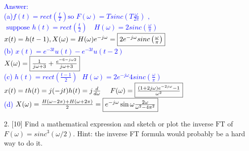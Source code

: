 \documentclass[12pt,a4paper]{article}
\begin{document}
\begin{tcolorbox}
\normalsize
\textcolor{blue}{Answer:\\
(a)$f(t)={rect}\left(\frac{t}{T}\right)\text{so }F(\omega)=T {sinc}\left(T \frac{\omega}{2 \pi}\right) \text { , }$\\
    $\text { suppose } h(t)={rect}\left(\frac{t}{2}\right) \quad H(\omega)=2 {sinc}\left(\frac{\omega}{\pi}\right)$\\
    $x(t)=h(t-1), X(\omega)=H(\omega) e^{-j \omega}=\fbox{$2 e^{-j \omega} {sinc}\left(\frac{\omega}{\pi}\right)$}$\\
(b) $x(t)=e^{-3t}u(t)-e^{-3t}u(t-2)$\\
$X(\omega)=\fbox{$\frac{1}{j\omega+3}+\frac{e^{-6-j\omega2}}{j\omega+3}$}$\\
(c) $ h(t)={rect}\left(\frac{t-1}{2}\right)~~~H(\omega)=2 e^{-j \omega} 4{sinc}\left(\frac{\omega}{\pi}\right)$\\
$x(t)=th(t)=j(-jt)h(t)=j\frac{d}{d\omega}~~~~F(\omega)=\fbox{$\frac{(1+2 j \omega) e^{-2 j \omega}-1}{\omega^{2}}$}$\\
(d) $X(\omega)=\frac{H(\omega-2\pi)+H(\omega+2\pi)}{2}=\fbox{$e^{-j \omega} \sin \omega \frac{2 \omega}{\omega^{2}-4 \pi^{2}}$}$
}
\end{tcolorbox}

\begin{tcolorbox}[colback = white]
2. [10] Find a mathematical expression and sketch or plot the inverse $\mathrm{FT}$ of $F(\omega)={sinc}^{3}(\omega / 2)$. Hint: the inverse FT formula would probably be a hard way to do it.
\end{tcolorbox}
\end{document}
